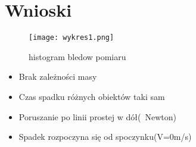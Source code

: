\documentclass{article}
\begin{document}
\section{Wnioski}
\begin{figure}[h]
\texttt{[image: wykres1.png]}
\label{fig:wyniki pomiaru 1}
\caption{histogram bledow pomiaru}
\end{figure}
\begin{itemize}
\item Brak zależności masy

\item Czas spadku różnych obiektów taki sam

\item Poruszanie po linii prostej w dół(~Newton)

\item Spadek rozpoczyna się od spoczynku(V=0m/s)
\end{itemize}
\newpage
\tableofcontents
\end{document}
